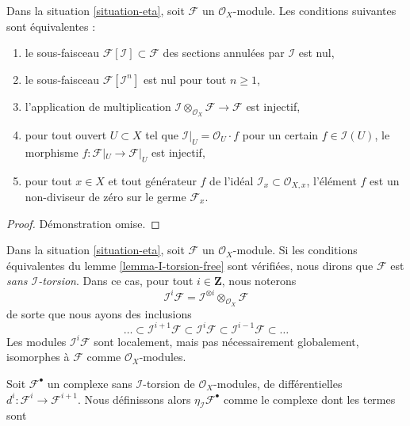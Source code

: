 \begin{lemma}

\label{lemma-I-torsion-free}

Dans la situation \ref{situation-eta},
soit $\mathcal{F}$ un $\mathcal{O}_X$-module. Les conditions suivantes sont équivalentes :

\begin{enumerate}

\item le sous-faisceau $\mathcal{F}[\mathcal{I}] \subset \mathcal{F}$
des sections annulées par $\mathcal{I}$ est nul,
\item le sous-faisceau $\mathcal{F}[\mathcal{I}^n]$ est nul pour tout $n \geq 1$,
\item l'application de multiplication
$\mathcal{I} \otimes_{\mathcal{O}_X} \mathcal{F} \to \mathcal{F}$
est injectif,
\item pour tout ouvert $U \subset X$ tel que
$\mathcal{I}|_U = \mathcal{O}_U \cdot f$
pour un certain $f \in \mathcal{I}(U)$,
le morphisme $f : \mathcal{F}|_U \to \mathcal{F}|_U$ est injectif,
\item pour tout $x \in X$ et tout générateur $f$ de l'idéal
$\mathcal{I}_x \subset \mathcal{O}_{X, x}$, l'élément $f$
est un non-diviseur de zéro sur le germe $\mathcal{F}_x$.

\end{enumerate}

\end{lemma}

\begin{proof}
Démonstration omise.
\end{proof}

\noindent
Dans la situation \ref{situation-eta}, soit $\mathcal{F}$ un $\mathcal{O}_X$-module. Si les conditions équivalentes du lemme \ref{lemma-I-torsion-free} sont vérifiées, nous dirons que $\mathcal{F}$ est {\it sans $\mathcal{I}$-torsion}. Dans ce cas, pour tout $i \in \mathbf{Z}$, nous noterons $$
\mathcal{I}^i\mathcal{F} =
\mathcal{I}^{\otimes i} \otimes_{\mathcal{O}_X} \mathcal{F}
$$ de sorte que nous ayons des inclusions $$
\ldots \subset
\mathcal{I}^{i + 1}\mathcal{F} \subset
\mathcal{I}^i\mathcal{F} \subset
\mathcal{I}^{i - 1}\mathcal{F} \subset \ldots
$$ Les modules $\mathcal{I}^i\mathcal{F}$ sont localement, mais pas nécessairement globalement, isomorphes à $\mathcal{F}$ comme $\mathcal{O}_X$-modules.

\medskip\noindent

Soit $\mathcal{F}^\bullet$ un complexe sans $\mathcal{I}$-torsion de $\mathcal{O}_X$-modules, de différentielles $d^i : \mathcal{F}^i \to \mathcal{F}^{i + 1}$. Nous définissons alors $\eta_\mathcal{I}\mathcal{F}^\bullet$
comme le complexe dont les termes sont

